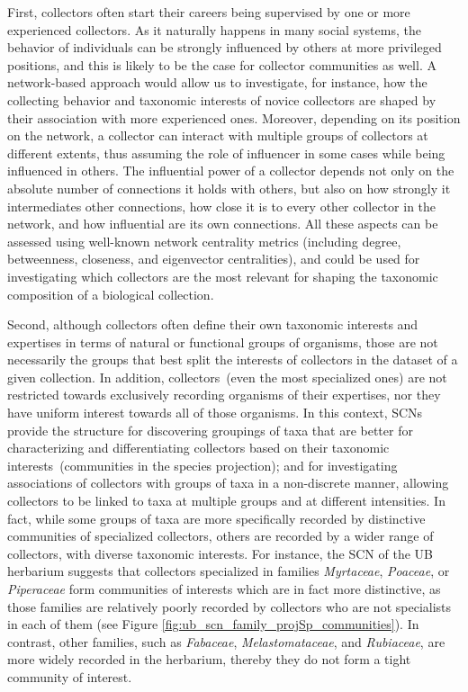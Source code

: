 First, collectors often start their careers being supervised by one or more experienced collectors.
As it naturally happens in many social systems, the behavior of individuals can be strongly influenced by others at more privileged positions, and this is likely to be the case for collector communities as well.
A network-based approach would allow us to investigate, for instance, how the collecting behavior and taxonomic interests of novice collectors are shaped by their association with more experienced ones.
Moreover, depending on its position on the network, a collector can interact with multiple groups of collectors at different extents, thus assuming the role of influencer in some cases while being influenced in others.
The influential power of a collector depends not only on the absolute number of connections it holds with others, but also on how strongly it intermediates other connections, how close it is to every other collector in the network, and how influential are its own connections. %
All these aspects can be assessed using well-known network centrality metrics (including degree, betweenness, closeness, and eigenvector centralities), and could be used for investigating which collectors are the most relevant for shaping the taxonomic composition of a biological collection. 

Second, although collectors often define their own taxonomic interests and expertises in terms of natural or functional groups of organisms, those are not necessarily the groups that best split the interests of collectors in the dataset of a given collection.
In addition, collectors~(even the most specialized ones) are not restricted towards exclusively recording organisms of their expertises, nor they have uniform interest towards all of those organisms.
%
In this context, SCNs provide the structure for discovering groupings of taxa that are better for characterizing and differentiating collectors based on their taxonomic interests~(communities in the species projection); and for investigating associations of collectors with groups of taxa in a non-discrete manner, allowing collectors to be linked to taxa at multiple groups and at different intensities.
%
In fact, while some groups of taxa are more specifically recorded by distinctive communities of specialized collectors, others are recorded by a wider range of collectors, with diverse taxonomic interests.
For instance, the SCN of the UB herbarium suggests that collectors specialized in families \textit{Myrtaceae}, \textit{Poaceae}, or \textit{Piperaceae} form communities of interests which are in fact more distinctive, as those families are relatively poorly recorded by collectors who are not specialists in each of them (see Figure \ref{fig:ub_scn_family_projSp_communities}).
In contrast, other families, such as \textit{Fabaceae}, \textit{Melastomataceae}, and \textit{Rubiaceae}, are more widely recorded in the herbarium, thereby they do not form a tight community of interest.

